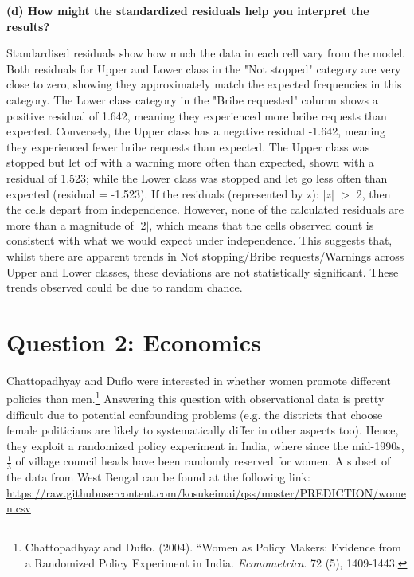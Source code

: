 \documentclass[12pt,letterpaper]{article}
\begin{document}
\begin{enumerate}
	
	\vspace{0cm}
	\textbf{(d) How might the standardized residuals help you interpret the results?}  
	
	Standardised residuals show how much the data in each cell vary from the model. Both residuals for Upper and Lower class in the "Not stopped" category are very close to zero, showing they approximately match the expected frequencies in this category. The Lower class category in the "Bribe requested" column shows a positive residual of 1.642, meaning they experienced more bribe requests than expected. Conversely, the Upper class has a negative residual -1.642, meaning they experienced fewer bribe requests than expected. The Upper class was stopped but let off with a warning more often than expected, shown with a residual of 1.523; while the Lower class was stopped and let go less often than expected (residual = -1.523). If the residuals (represented by z): $|z|$ $ > $ 2, then the cells depart from independence. However, none of the calculated residuals are more than a magnitude of $|2|$, which means that the cells observed count is consistent with what we would expect under independence. This suggests that, whilst there are apparent trends in Not stopping/Bribe requests/Warnings across Upper and Lower classes, these deviations are not statistically significant. These trends observed could be due to random chance.
	
\end{enumerate}
\newpage

\section*{Question 2: Economics}
Chattopadhyay and Duflo were interested in whether women promote different policies than men.\footnote{Chattopadhyay and Duflo. (2004). ``Women as Policy Makers: Evidence from a Randomized Policy Experiment in India. \textit{Econometrica}. 72 (5), 1409-1443.} Answering this question with observational data is pretty difficult due to potential confounding problems (e.g. the districts that choose female politicians are likely to systematically differ in other aspects too). Hence, they exploit a randomized policy experiment in India, where since the mid-1990s, $\frac{1}{3}$ of village council heads have been randomly reserved for women. A subset of the data from West Bengal can be found at the following link: \url{https://raw.githubusercontent.com/kosukeimai/qss/master/PREDICTION/women.csv}\\
\end{document}
